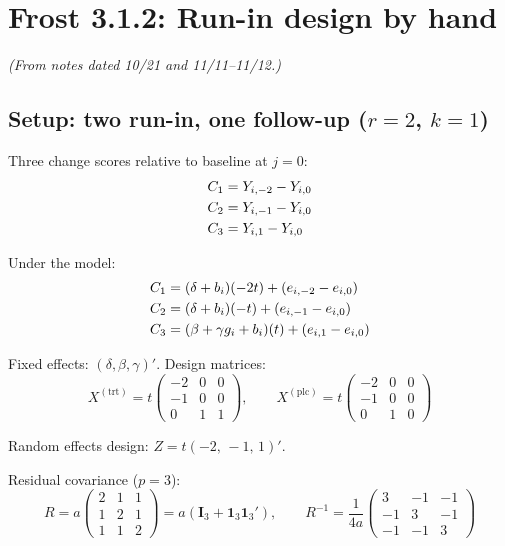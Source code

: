 \documentclass[11pt]{article}
\newcommand{\bI}{\mathbf{I}}
\newcommand{\bone}{\mathbf{1}}
\begin{document}
\section{Frost 3.1.2: Run-in design by hand}
\label{sec:frost312}

\noindent
\textit{(From notes dated 10/21 and 11/11--11/12.)}


\subsection{Setup: two run-in, one follow-up ($r=2$, $k=1$)}

Three change scores relative to baseline at $j = 0$:
\begin{align}
  C_1 &= Y_{i,-2} - Y_{i,0} \notag \\
  C_2 &= Y_{i,-1} - Y_{i,0} \notag \\
  C_3 &= Y_{i,1} - Y_{i,0}
\end{align}

Under the model:
\begin{align}
  C_1 &= (\delta + b_i)(-2t) + (e_{i,-2} - e_{i,0}) \notag \\
  C_2 &= (\delta + b_i)(-t) + (e_{i,-1} - e_{i,0}) \notag \\
  C_3 &= (\beta + \gamma g_i + b_i)(t) + (e_{i,1} - e_{i,0})
\end{align}

Fixed effects: $(\delta, \beta, \gamma)'$. Design matrices:
\begin{equation}
  X^{(\text{trt})} = t\begin{pmatrix}
    -2 & 0 & 0 \\ -1 & 0 & 0 \\ 0 & 1 & 1
  \end{pmatrix}, \qquad
  X^{(\text{plc})} = t\begin{pmatrix}
    -2 & 0 & 0 \\ -1 & 0 & 0 \\ 0 & 1 & 0
  \end{pmatrix}
\end{equation}

Random effects design:
$Z = t(-2,\, -1,\, 1)'$.

Residual covariance ($p = 3$):
\begin{equation}
  R = a\begin{pmatrix}
    2 & 1 & 1 \\ 1 & 2 & 1 \\ 1 & 1 & 2
  \end{pmatrix}
  = a(\bI_3 + \bone_3\bone_3'), \qquad
  R^{-1} = \frac{1}{4a}\begin{pmatrix}
    3 & -1 & -1 \\ -1 & 3 & -1 \\ -1 & -1 & 3
  \end{pmatrix}
\end{equation}
\end{document}
